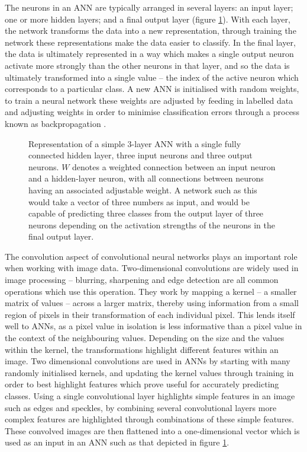 \documentclass[a4paper,11pt,twoside,openright]{scrbook}
\begin{document}
The neurons in an ANN are typically arranged in several layers: an input layer; one or more hidden layers; and a final output layer (figure \ref{figure:nn_layers}).
With each layer, the network transforms the data into a new representation, through training the network these representations make the data easier to classify.
In the final layer, the data is ultimately represented in a way which makes a single output neuron activate more strongly than the other neurons in that layer, and so the data is ultimately transformed into a single value -- the index of the active neuron which corresponds to a particular class.
A new ANN is initialised with random weights, to train a neural network these weights are adjusted by feeding in labelled data and adjusting weights in order to minimise classification errors through a process known as backpropagation \cite{Rumelhart1986}.




\begin{figure}
\fcapsideleft
{
    \caption[Representation of a simple ANN]{Representation of a simple 3-layer ANN with a single fully connected hidden layer, three input neurons and three output neurons. $W$ denotes a weighted connection between an input neuron and a hidden-layer neuron, with all connections between neurons having an associated adjustable weight. A network such as this would take a vector of three numbers as input, and would be capable of predicting three classes from the output layer of three neurons depending on the activation strengths of the neurons in the final output layer.}
} {
    
    \label{figure:nn_layers}
}
\end{figure}

The convolution aspect of convolutional neural networks plays an important role when working with image data.
Two-dimensional convolutions are widely used in image processing -- blurring, sharpening and edge detection are all common operations which use this operation.
They work by mapping a kernel -- a smaller matrix of values -- across a larger matrix, thereby using information from a small region of pixels in their transformation of each individual pixel.
This lends itself well to ANNs, as a pixel value in isolation is less informative than a pixel value in the context of the neighbouring values.
Depending on the size and the values within the kernel, the transformations highlight different features within an image.
Two dimensional convolutions are used in ANNs by starting with many randomly initialised kernels, and updating the kernel values through training in order to best highlight features which prove useful for accurately predicting classes.
Using a single convolutional layer highlights simple features in an image such as edges and speckles, by combining several convolutional layers more complex features are highlighted through combinations of these simple features.
These convolved images are then flattened into a one-dimensional vector which is used as an input in an ANN such as that depicted in figure \ref{figure:nn_layers}.
\end{document}
